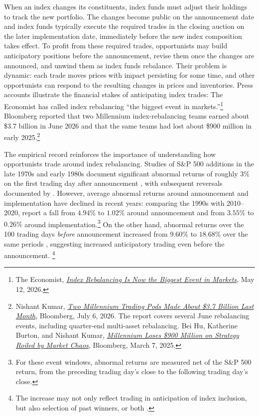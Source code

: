 \documentclass[12pt]{article}
\numberwithin{equation}{section}
\theoremstyle{definition}
\begin{document}
When an index changes its constituents, index funds must adjust their holdings
to track the new portfolio. The changes become public on the announcement date and index funds typically execute the required trades in the closing auction on
the later implementation date, immediately before the new index composition
takes effect. To profit from these required trades, opportunists may build
anticipatory positions before the announcement, revise them once the changes
are announced, and unwind them as index funds rebalance. Their problem is
dynamic: each trade moves prices with impact persisting for some time, and other
opportunists can respond to the resulting changes in prices and inventories.
Press accounts illustrate the financial stakes of anticipating index trades:
The Economist has called index rebalancing ``the biggest event in markets.''\footnote{The Economist,
\href{https://www.economist.com/finance-and-economics/2026/05/12/index-rebalancing-is-now-the-biggest-event-in-markets}
{\emph{Index Rebalancing Is Now the Biggest Event in Markets}}, May 12, 2026.}
Bloomberg reported that two Millennium
index-rebalancing teams
earned about \$3.7 billion in June 2026 and that the same teams had lost about
\$900 million in early 2025.\footnote{Nishant Kumar,
\href{https://www.bloomberg.com/news/articles/2026-07-06/two-millennium-trading-pods-made-about-3-7-billion-last-month}
{\emph{Two Millennium Trading Pods Made About \$3.7 Billion Last Month}},
Bloomberg, July 6, 2026. The report covers several June rebalancing events,
including quarter-end multi-asset rebalancing. Bei Hu, Katherine Burton, and
Nishant Kumar,
\href{https://www.bloomberg.com/news/articles/2025-03-08/millennium-loses-900-million-on-strategy-roiled-by-market-chaos}
{\emph{Millennium Loses \$900 Million on Strategy Roiled by Market Chaos}},
Bloomberg, March 7, 2025.}

The empirical record reinforces the importance of understanding how
opportunists trade around index rebalancing.
Studies of S\&P 500 additions in the late 1970s and early 1980s document
significant abnormal returns of roughly \(3\%\) on the first trading day
after announcement
\citep{Shleifer1986,HarrisGurel1986}, with subsequent reversals documented by
\citet{HarrisGurel1986}. However, average abnormal returns around announcement and
implementation have declined in recent years: comparing the 1990s with 2010--2020,
\citet{GreenwoodSammon2025} report a fall from \(4.94\%\) to \(1.02\%\)
around announcement and from \(3.55\%\) to \(0.26\%\) around
implementation.\footnote{For these event windows, abnormal returns are measured
net of the S\&P 500 return, from the preceding trading day's close to the
following trading day's close.}
On the other hand, abnormal returns over the 100 trading days \emph{before} announcement
increased from \(9.60\%\) to \(18.68\%\) over the same periods
\citep[Table~IV]{GreenwoodSammon2025}, suggesting increased anticipatory trading
even before the announcement.
\footnote{The increase may not only reflect trading in anticipation of
index inclusion, but also selection of past winners, or both \citep{GreenwoodSammon2025}.}
\end{document}
